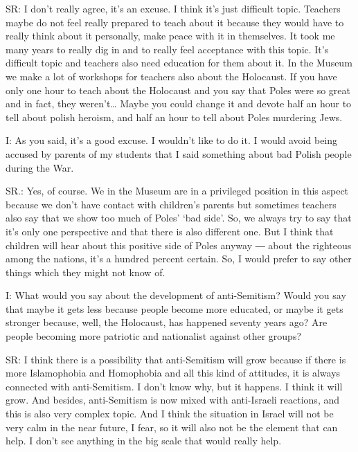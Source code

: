  

SR: I don’t really agree, it’s an excuse. I think it’s just difficult topic. Teachers maybe do not feel really prepared to teach about it because they would have to really think about it personally, make peace with it in themselves. It took me many years to really dig in and to really feel acceptance with this topic. It’s difficult topic and teachers also need education for them about it. In the Museum we make a lot of workshops for teachers also about the Holocaust. If you have only one hour to teach about the Holocaust and you say that Poles were so great and in fact, they weren’t… Maybe you could change it and devote half an hour to tell about polish heroism, and half an hour to tell about Poles murdering Jews. 

 

I: As you said, it’s a good excuse. I wouldn’t like to do it. I would avoid being accused by parents of my students that I said something about bad Polish people during the War. 

 

SR.: Yes, of course. We in the Museum are in a privileged position in this aspect because we don’t have contact with children’s parents but sometimes teachers also say that we show too much of Poles’ ‘bad side’. So, we always try to say that it’s only one perspective and that there is also different one. But I think that children will hear about this positive side of Poles anyway ― about the righteous among the nations, it’s a hundred percent certain. So, I would prefer to say other things which they might not know of. 

 

I: What would you say about the development of anti-Semitism? Would you say that maybe it gets less because people become more educated, or maybe it gets stronger because, well, the Holocaust, has happened seventy years ago? Are people becoming more patriotic and nationalist against other groups? 

 

SR: I think there is a possibility that anti-Semitism will grow because if there is more Islamophobia and Homophobia and all this kind of attitudes, it is always connected with anti-Semitism. I don’t know why, but it happens. I think it will grow. And besides, anti-Semitism is now mixed with anti-Israeli reactions, and this is also very complex topic. And I think the situation in Israel will not be very calm in the near future, I fear, so it will also not be the element that can help. I don’t see anything in the big scale that would really help. 
 

